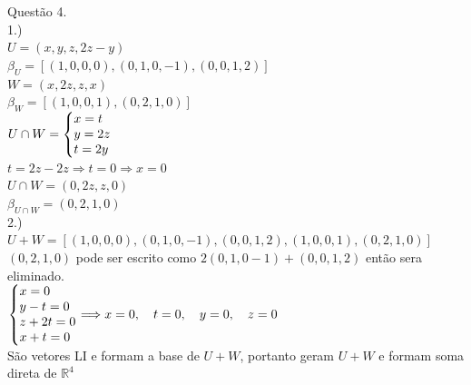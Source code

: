 \documentclass[12pt]{article}
\begin{document}
Questão 4.\\
1.)\\
$U = (x,y,z,2z-y)$\\
$\beta_{U} = [(1,0,0,0),(0,1,0,-1),(0,0,1,2)]$\\
$W = (x,2z,z,x)$\\
$\beta_{W} = [(1,0,0,1),(0,2,1,0)]$\\
$U\cap W = \left\{\begin{array}{@{}l@{}}
	x=t\\
	y=2z\\
	t=2\-y
\end{array}\right.$\\
$t=2z-2z \Longrightarrow t = 0 \Longrightarrow x = 0$\\
$U\cap W = (0,2z,z,0)$\\
$\beta_{U\cap W} = (0,2,1,0)$\\
2.)\\
$U+W = [(1,0,0,0),(0,1,0,-1),(0,0,1,2),(1,0,0,1),(0,2,1,0)]$\\
$(0,2,1,0)$ pode ser escrito como $2(0,1,0-1) + (0,0,1,2)$ então sera eliminado.\\
$\left\{\begin{array}{@{}l@{}}
	x=0\\
	y-t=0\\
	z+2t=0\\
	x+t=0
\end{array}\right. \Longrightarrow x = 0,\quad t = 0, \quad y = 0,\quad z =0$\\
São vetores LI e formam a base de $U+W$, portanto geram $U+W$ e formam soma direta de $\mathds{R}^{4}$\\
\end{document}
